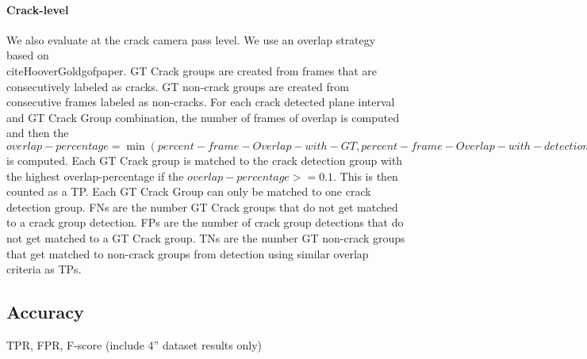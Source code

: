         \paragraph{Crack-level}
            We also evaluate at the crack camera pass level. We use an overlap strategy based on \\cite{HooverGoldgofpaper}. GT Crack groups are created from frames that are consecutively labeled as cracks. GT non-crack groups are created from consecutive frames labeled as non-cracks.  For each crack detected plane interval and GT Crack Group combination, the number of frames of overlap is computed and then the $overlap-percentage = \min( percent-frame-Overlap-with-GT, percent-frame-Overlap-with-detection)$ is computed.   Each GT Crack group is matched to the crack detection group with the highest overlap-percentage if the $overlap-percentage >= 0.1$. This is then counted as a TP.  Each GT Crack Group can only be matched to one crack detection group. 
            FNs are the number GT Crack groups that do not get matched to a crack group detection. 
            FPs are the number of crack group detections that do not get matched to a GT Crack group.
            TNs are the number GT non-crack groups that get matched to non-crack groups from detection using similar overlap criteria as TPs. 

    \subsection{Accuracy}
        TPR, FPR, F-score (include 4” dataset results only)
        
        
        
